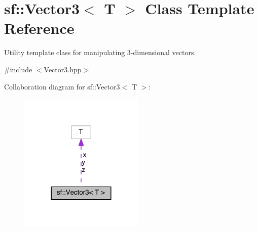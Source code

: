 \hypertarget{classsf_1_1_vector3}{\section{sf\-:\-:Vector3$<$ T $>$ Class Template Reference}
\label{classsf_1_1_vector3}
}


Utility template class for manipulating 3-\/dimensional vectors.  




{\ttfamily \#include $<$Vector3.\-hpp$>$}



Collaboration diagram for sf\-:\-:Vector3$<$ T $>$\-:
\nopagebreak
\begin{figure}[H]
\begin{center}
\leavevmode
\includegraphics[width=168pt]{classsf_1_1_vector3__coll__graph}
\end{center}
\end{figure}
